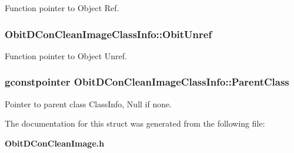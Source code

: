 Function pointer to Object Ref. 

\subsubsection{ {\bf Obit\-DCon\-Clean\-Image\-Class\-Info::Obit\-Unref}}\label{structObitDConCleanImageClassInfo_o11}


Function pointer to Object Unref. 

\subsubsection{\setlength{\rightskip}{0pt plus 5cm}gconstpointer {\bf Obit\-DCon\-Clean\-Image\-Class\-Info::Parent\-Class}}\label{structObitDConCleanImageClassInfo_o3}


Pointer to parent class Class\-Info, Null if none. 



The documentation for this struct was generated from the following file:\begin{CompactItemize}
\item 
{\bf Obit\-DCon\-Clean\-Image.h}\end{CompactItemize}
